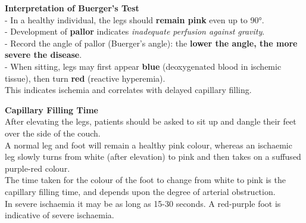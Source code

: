 \documentclass[
  13.5pt,
  a4paper,
  DIV=11,
  numbers=noendperiod]{scrreprt}
\begin{document}
\begin{tcolorbox}[enhanced jigsaw, left=2mm, toptitle=1mm, breakable, title=\textcolor{quarto-callout-note-color}{\faInfo}\hspace{0.5em}{Note}, coltitle=black, opacitybacktitle=0.6, arc=.35mm, colback=white, leftrule=.75mm, toprule=.15mm, bottomtitle=1mm, titlerule=0mm, rightrule=.15mm, colbacktitle=quarto-callout-note-color!10!white, bottomrule=.15mm, opacityback=0, colframe=quarto-callout-note-color-frame]

\textbf{Interpretation of Buerger's Test}\\
- In a healthy individual, the legs should \textbf{remain pink} even up
to 90°.\\
- Development of \textbf{pallor} indicates \emph{inadequate perfusion
against gravity}.\\
- Record the angle of pallor (Buerger's angle): the \textbf{lower the
angle, the more severe the disease}.\\
- When sitting, legs may first appear \textbf{blue} (deoxygenated blood
in ischemic tissue), then turn \textbf{red} (reactive hyperemia).\\
This indicates ischemia and correlates with delayed capillary filling.

\end{tcolorbox}

\begin{tcolorbox}[enhanced jigsaw, left=2mm, toptitle=1mm, breakable, title=\textcolor{quarto-callout-note-color}{\faInfo}\hspace{0.5em}{Note}, coltitle=black, opacitybacktitle=0.6, arc=.35mm, colback=white, leftrule=.75mm, toprule=.15mm, bottomtitle=1mm, titlerule=0mm, rightrule=.15mm, colbacktitle=quarto-callout-note-color!10!white, bottomrule=.15mm, opacityback=0, colframe=quarto-callout-note-color-frame]

\textbf{Capillary Filling Time}\\
After elevating the legs, patients should be asked to sit up and dangle
their feet over the side of the couch.\\
A normal leg and foot will remain a healthy pink colour, whereas an
ischaemic leg slowly turns from white (after elevation) to pink and then
takes on a suffused purple-red colour.\\
The time taken for the colour of the foot to change from white to pink
is the capillary filling time, and depends upon the degree of arterial
obstruction.\\
In severe ischaemia it may be as long as 15-30 seconds. A red-purple
foot is indicative of severe ischaemia.

\end{tcolorbox}
\end{document}
